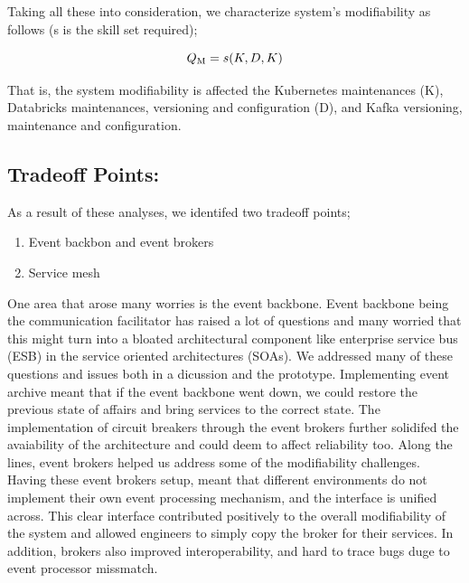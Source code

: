 \documentclass[review]{elsarticle}
\begin{document}
Taking all these into consideration, we characterize system's modifiability as follows (s is the skill set required);

\begin{equation}
    Q\textsubscript{M} = s(K, D, K)
\end{equation}

That is, the system modifiability is affected the Kubernetes maintenances (K), Databricks maintenances, versioning and configuration (D), and Kafka versioning, maintenance and configuration.

\subsection{Tradeoff Points:}

As a result of these analyses, we identifed two tradeoff points;

\begin{enumerate}
    \item Event backbon and event brokers
    \item Service mesh
\end{enumerate}

One area that arose many worries is the event backbone. Event backbone being the communication facilitator has raised a lot of questions and many worried that this might turn into a bloated architectural component like enterprise service bus (ESB) in the service oriented architectures (SOAs). We addressed many of these questions and issues both in a dicussion and the prototype. Implementing event archive meant that if the event backbone went down, we could restore the previous state of affairs and bring services to the correct state. The implementation of circuit breakers through the event brokers further solidifed the avaiability of the architecture and could deem to affect reliability too. Along the lines, event brokers helped us address some of the modifiability challenges. Having these event brokers setup, meant that different environments do not implement their own event processing mechanism, and the interface is unified across. This clear interface contributed positively to the overall modifiability of the system and allowed engineers to simply copy the broker for their services. In addition, brokers also improved interoperability, and hard to trace bugs duge to event processor missmatch.
\end{document}
